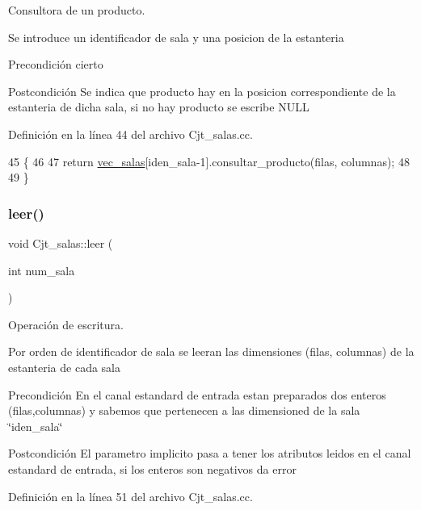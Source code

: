 Consultora de un producto. 

Se introduce un identificador de sala y una posicion de la estanteria \begin{DoxyPrecond}{Precondición}
cierto 
\end{DoxyPrecond}
\begin{DoxyPostcond}{Postcondición}
Se indica que producto hay en la posicion correspondiente de la estanteria de dicha sala, si no hay producto se escribe N\+U\+LL 
\end{DoxyPostcond}


Definición en la línea 44 del archivo Cjt\+\_\+salas.\+cc.


\begin{DoxyCode}
45 \{
46   
47   \textcolor{keywordflow}{return} \hyperlink{class_cjt__salas_a3f130cc8bab35f449de8be69283af09e}{vec\_salas}[iden\_sala-1].consultar\_producto(filas, columnas);
48   
49 \}
\end{DoxyCode}
\mbox{\label{class_cjt__salas_ae79acb3461bd487e7bda3af42a3f96b7}} 
\subsubsection{\texorpdfstring{leer()}{leer()}}
{\footnotesize\ttfamily void Cjt\+\_\+salas\+::leer (\begin{DoxyParamCaption}\item[{int}]{num\+\_\+sala }\end{DoxyParamCaption})}



Operación de escritura. 

Por orden de identificador de sala se leeran las dimensiones (filas, columnas) de la estanteria de cada sala \begin{DoxyPrecond}{Precondición}
En el canal estandard de entrada estan preparados dos enteros (filas,columnas) y sabemos que pertenecen a las dimensioned de la sala \char`\"{}iden\+\_\+sala\char`\"{} 
\end{DoxyPrecond}
\begin{DoxyPostcond}{Postcondición}
El parametro implicito pasa a tener los atributos leidos en el canal estandard de entrada, si los enteros son negativos da error 
\end{DoxyPostcond}


Definición en la línea 51 del archivo Cjt\+\_\+salas.\+cc.


